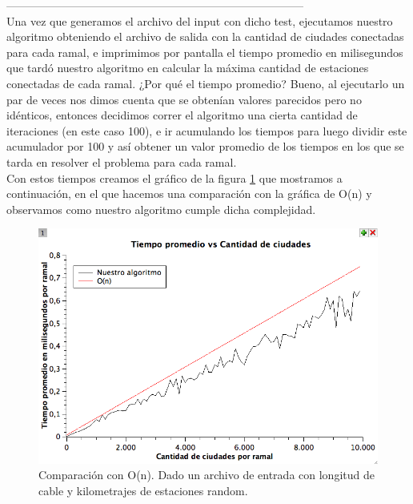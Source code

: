 --------------------------------------------------------------------------------\\

Una vez que generamos el archivo del input con dicho test, ejecutamos nuestro algoritmo obteniendo el archivo de salida con la cantidad de ciudades conectadas para cada ramal, e imprimimos por pantalla el tiempo promedio en milisegundos que tardó nuestro algoritmo en calcular la máxima cantidad de estaciones conectadas de cada ramal. ¿Por qué el tiempo promedio? Bueno, al ejecutarlo un par de veces nos dimos cuenta que se obtenían valores parecidos pero no idénticos, entonces decidimos correr el algoritmo una cierta cantidad de iteraciones (en este caso 100), e ir acumulando los tiempos para luego dividir este acumulador por 100 y así obtener un valor promedio de los tiempos en los que se tarda en resolver el problema para cada ramal. \\

Con estos tiempos creamos el gráfico de la figura \ref{ej1-tiempo-vs-cant-ciudades-random} que mostramos a continuación, en el que hacemos una comparación con la gráfica de O(n) y observamos como nuestro algoritmo cumple dicha complejidad.

\begin{figure}[H]
\begin{center}

  \includegraphics[width=\linewidth]{../graficos/ej1/TiempoPromedioVsCantidadCiudades.png}
  \caption{{\small Comparación con O(n). Dado un archivo de entrada con longitud de cable y kilometrajes de estaciones random.}} \label{ej1-tiempo-vs-cant-ciudades-random}
\endminipage

\end{center}
\end{figure}

